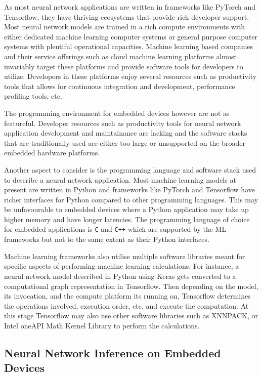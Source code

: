 As most neural network applications are written in frameworks like PyTorch and Tensorflow, they have thriving ecosystems that provide rich developer support. Most neural network models are trained in a rich compute environments with either dedicated machine learning computer systems or general purpose computer systems with plentiful operational capacities. Machine learning based companies and their service offerings such as cloud machine learning platforms almost invariably target these platforms and provide software tools for developers to utilize. Developers in these platforms enjoy several resources such as productivity tools that allows for continuous integration and development, performance profiling tools, etc.


The programming environment for embedded devices however are not as featureful. Developer resources such as productivity tools for neural network application development and maintainance are lacking and the software stacks that are traditionally used are either too large or unsupported on the broader embedded hardware platforms.

Another aspect to consider is the programming language and software stack used to describe a neural network application. Most machine learning models at present are written in Python and frameworks like PyTorch and Tensorflow have richer interfaces for Python compared to other programming languages. This may be unfavourable to embedded devices where a Python application may take up higher memory and have longer latencies. The programming language of choice for embedded applications is \texttt{C} and \texttt{C++} which are supported by the ML frameworks but not to the same extent as their Python interfaces.

Machine learning frameworks also utilise multiple software libraries meant for specific aspects of performing machine learning calculations. For instance, a neural network model described in Python using Keras gets converted to a computational graph representation in Tensorflow. Then depending on the model, its invocation, and the compute platform its running on, Tensorflow determines the operations involved, execution order, etc. and execute the computation. At this stage Tensorflow may also use other software libraries such as XNNPACK, or Intel oneAPI Math Kernel Library to perform the calculations.

\subsection{Neural Network Inference on Embedded Devices}

